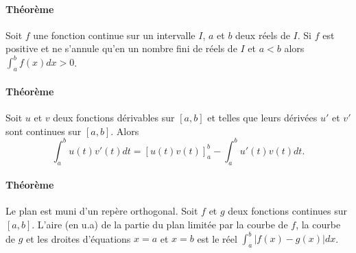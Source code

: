 \documentclass{article}
\begin{document}
\paragraph{Théorème}
Soit $f$ une fonction continue sur un intervalle $I$, $a$ et $b$ deux réels de $I$.
Si $f$ est positive et ne s'annule qu'en un nombre fini de réels de $I$ et $a < b$ alors $\int_a^b f(x)dx > 0$.

\paragraph{Théorème}
Soit $u$ et $v$ deux fonctions dérivables sur $[a,b]$ et telles que leurs dérivées $u'$ et $v'$ sont continues sur $[a,b]$. Alors
\[
\int_a^b u(t)v'(t)dt = [u(t)v(t)]_a^b - \int_a^b u'(t)v(t)dt.
\]

\paragraph{Théorème}
Le plan est muni d'un repère orthogonal.
Soit $f$ et $g$ deux fonctions continues sur $[a,b]$.
L'aire (en u.a) de la partie du plan limitée par la courbe de $f$, la courbe de $g$ et les droites d'équations $x=a$ et $x=b$ est le réel $\int_a^b |f(x)-g(x)|dx$.
\end{document}
